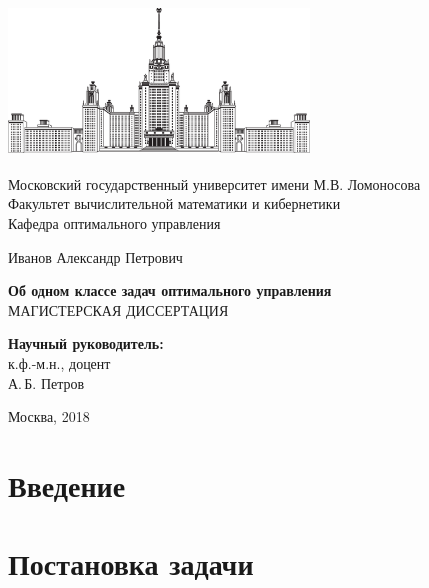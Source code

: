 \documentclass[12pt, a4paper]{article}
\begin{document}
\begin{titlepage}
\begin{center}
\includegraphics[width=8cm, height=4cm]{msu_logo.eps}
\end{center}
\begin{center}
Московский государственный университет имени М.В. Ломоносова\\
\vspace{0.1 cm}
Факультет вычислительной математики и кибернетики\\
\vspace{0.1 cm}
Кафедра оптимального управления

\vspace{3cm}
{\Large Иванов Александр Петрович }\\
\vspace{1cm}

{\bf\LARGE Об одном классе задач оптимального управления}\\ \vspace{2cm}
МАГИСТЕРСКАЯ ДИССЕРТАЦИЯ

\end{center}
\vspace{2cm}
\begin{flushright}

{\bf Научный руководитель:}\\
к.ф.-м.н., доцент\\
А.\,Б. Петров

\end{flushright}

 \vspace{4.5cm}

\centerline {Москва, 2018}

\end{titlepage}
\section{Введение}

\section{Постановка задачи}
\end{document}
